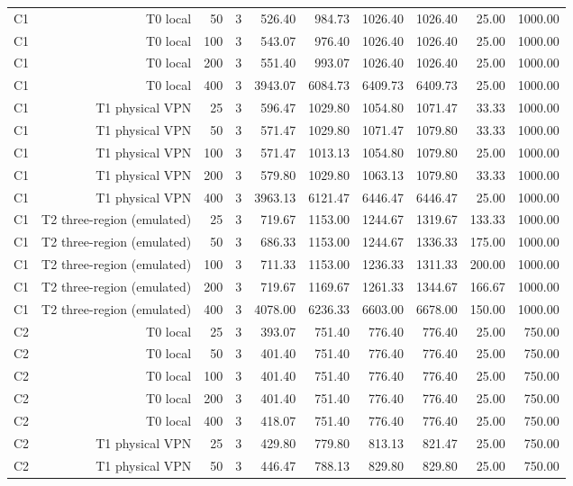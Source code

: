 \begin{table}[t]
\begin{tabular}{lrrrrrrrrr}
C1 & T0 local & 50 & 3 & 526.40 & 984.73 & 1026.40 & 1026.40 & 25.00 & 1000.00 \\
C1 & T0 local & 100 & 3 & 543.07 & 976.40 & 1026.40 & 1026.40 & 25.00 & 1000.00 \\
C1 & T0 local & 200 & 3 & 551.40 & 993.07 & 1026.40 & 1026.40 & 25.00 & 1000.00 \\
C1 & T0 local & 400 & 3 & 3943.07 & 6084.73 & 6409.73 & 6409.73 & 25.00 & 1000.00 \\
C1 & T1 physical VPN & 25 & 3 & 596.47 & 1029.80 & 1054.80 & 1071.47 & 33.33 & 1000.00 \\
C1 & T1 physical VPN & 50 & 3 & 571.47 & 1029.80 & 1071.47 & 1079.80 & 33.33 & 1000.00 \\
C1 & T1 physical VPN & 100 & 3 & 571.47 & 1013.13 & 1054.80 & 1079.80 & 25.00 & 1000.00 \\
C1 & T1 physical VPN & 200 & 3 & 579.80 & 1029.80 & 1063.13 & 1079.80 & 33.33 & 1000.00 \\
C1 & T1 physical VPN & 400 & 3 & 3963.13 & 6121.47 & 6446.47 & 6446.47 & 25.00 & 1000.00 \\
C1 & T2 three-region (emulated) & 25 & 3 & 719.67 & 1153.00 & 1244.67 & 1319.67 & 133.33 & 1000.00 \\
C1 & T2 three-region (emulated) & 50 & 3 & 686.33 & 1153.00 & 1244.67 & 1336.33 & 175.00 & 1000.00 \\
C1 & T2 three-region (emulated) & 100 & 3 & 711.33 & 1153.00 & 1236.33 & 1311.33 & 200.00 & 1000.00 \\
C1 & T2 three-region (emulated) & 200 & 3 & 719.67 & 1169.67 & 1261.33 & 1344.67 & 166.67 & 1000.00 \\
C1 & T2 three-region (emulated) & 400 & 3 & 4078.00 & 6236.33 & 6603.00 & 6678.00 & 150.00 & 1000.00 \\
C2 & T0 local & 25 & 3 & 393.07 & 751.40 & 776.40 & 776.40 & 25.00 & 750.00 \\
C2 & T0 local & 50 & 3 & 401.40 & 751.40 & 776.40 & 776.40 & 25.00 & 750.00 \\
C2 & T0 local & 100 & 3 & 401.40 & 751.40 & 776.40 & 776.40 & 25.00 & 750.00 \\
C2 & T0 local & 200 & 3 & 401.40 & 751.40 & 776.40 & 776.40 & 25.00 & 750.00 \\
C2 & T0 local & 400 & 3 & 418.07 & 751.40 & 776.40 & 776.40 & 25.00 & 750.00 \\
C2 & T1 physical VPN & 25 & 3 & 429.80 & 779.80 & 813.13 & 821.47 & 25.00 & 750.00 \\
C2 & T1 physical VPN & 50 & 3 & 446.47 & 788.13 & 829.80 & 829.80 & 25.00 & 750.00 \\

\end{tabular}
\end{table}
